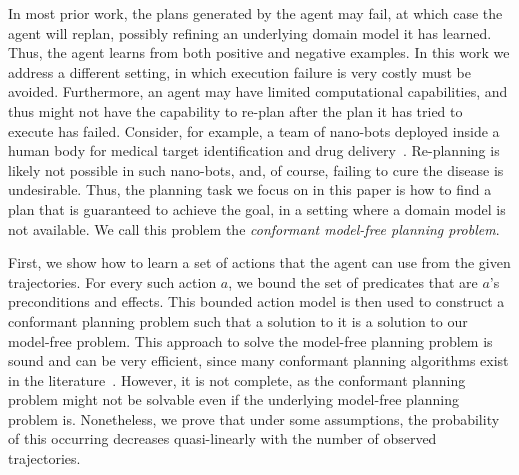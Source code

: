 \documentclass[letterpaper]{article}
\newcommand{\MEMO}[1]
{ \fbox{
\begin{minipage}[b]{7.9 cm}
#1
\end{minipage}
} }
\begin{document}
In most prior work, the plans generated by the agent may fail, at which case the agent will replan, possibly refining an underlying domain model it has learned. Thus, the agent learns from both positive and negative examples. In this work we address a different setting, in which execution failure is very costly must be avoided. Furthermore, an agent may have limited computational capabilities, and thus might not have the capability to re-plan after the plan it has tried to execute has failed. 
Consider, for example, a team of nano-bots deployed inside a human body for medical target identification and drug delivery~\cite{cavalcanti2007nanorobot}. Re-planning is likely not possible in such nano-bots, and, of course, failing to cure the disease is undesirable. Thus, the planning task we focus on in this paper is how to find a plan that is guaranteed to achieve the goal, in a setting where a domain model is not available. We call this problem the {\em conformant model-free planning problem}. 


First, we show how to learn a set of actions that the agent can use from the given trajectories. 
For every such action $a$, we bound the set of predicates that are $a$'s preconditions and effects. This bounded action model is then used  to construct a conformant planning problem such that a solution to it is a solution to our model-free problem. This approach to solve the model-free planning problem 
is sound and can be very efficient, since many conformant planning algorithms exist in the literature~\cite{palacios2009compiling,hoffmann2006conformant}. 
However, it is not complete, as the conformant planning problem might not be solvable even if the underlying model-free planning problem is. Nonetheless, we prove that under some assumptions, the probability of this occurring decreases quasi-linearly with the number of observed trajectories. %

\end{document}
